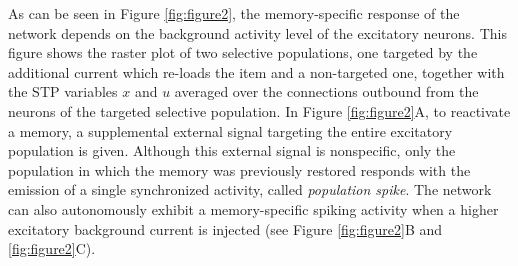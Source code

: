 \documentclass[a4paper, 12pt, twoside, openright]{book}
\begin{document}
As can be seen in Figure \ref{fig:figure2}, the memory-specific response of the network depends on the background activity level of the excitatory neurons. This figure shows the raster plot of two selective populations, one targeted by the additional current which re-loads the item and a non-targeted one, together with the STP variables $x$ and $u$ averaged over the connections outbound from the neurons of the targeted selective population. In Figure \ref{fig:figure2}A, to reactivate a memory, a supplemental external signal targeting the entire excitatory population is given. Although this external signal is nonspecific, only the population in which the memory was previously restored responds with the emission of a single synchronized activity, called \textit{population spike}. The network can also autonomously exhibit a memory-specific spiking activity when a higher excitatory background current is injected (see Figure \ref{fig:figure2}B and \ref{fig:figure2}C). 
\end{document}
